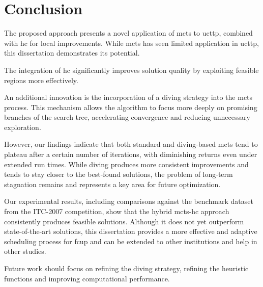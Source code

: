 
\chapter{Conclusion}


\label{Conclusion}

The proposed approach presents a novel application of \ac{mcts} to \ac{ucttp}, combined with \ac{hc} for local improvements. While \ac{mcts} has seen limited application in \ac{ucttp}, this dissertation demonstrates its potential.

The integration of \ac{hc} significantly improves solution quality by exploiting feasible regions more effectively.

An additional innovation is the incorporation of a diving strategy into the \ac{mcts} process. This mechanism allows the algorithm to focus more deeply on promising branches of the search tree, accelerating convergence and reducing unnecessary exploration.

However, our findings indicate that both standard and diving-based \ac{mcts} tend to plateau after a certain number of iterations, with diminishing returns even under extended run times. While diving produces more consistent improvements and tends to stay closer to the best-found solutions, the problem of long-term stagnation remains and represents a key area for future optimization.

Our experimental results, including comparisons against the benchmark dataset from the ITC-2007 competition, show that the hybrid \ac{mcts}-\ac{hc} approach consistently produces feasible solutions. Although it does not yet outperform state-of-the-art solutions, this dissertation provides a more effective and adaptive scheduling process for \ac{fcup} and can be extended to other institutions and help in other studies. 

Future work should focus on refining the diving strategy, refining the heuristic functions and improving computational performance.


